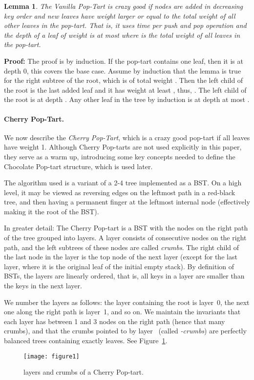 \documentclass[11pt]{article}
\newtheorem{lemma}[theorem]{Lemma}
\newenvironment{proof}{\noindent\textbf{Proof: }\ignorespaces}
  {\hspace*{\fill}\medskip}
\begin{document}
\begin{lemma}
The Vanilla Pop-Tart is crazy good if nodes are added in decreasing key
order and new leaves have weight larger or equal to the total weight of
all other leaves in the pop-tart.  That is, it uses  time per push
and pop operation and the depth of a leaf of weight  is at most
 where  is the total weight of all leaves in the
pop-tart.
\end{lemma}
\begin{proof}
The proof is by induction. If the pop-tart contains one leaf, then it is
at depth 0, this covers the base case.  Assume by induction that the
lemma is true for the right subtree of the root, which is of total
weight . Then the left child of the root is the last added leaf and
it has weight at least , thus, . The left child of the
root is at depth . Any other leaf in the tree by
induction is at depth at most .
\end{proof}

\paragraph{Cherry Pop-Tart.}
We now describe the \emph{Cherry Pop-Tart}, which is a crazy good
pop-tart if all leaves have weight 1. Although Cherry Pop-tarts are not
used explicitly in this paper, they serve as a warm up, introducing some
key concepts needed to define the Chocolate Pop-tart structure, which is
used later.

The algorithm used is a variant of a 2-4 tree implemented as a BST.  On
a high level, it may be viewed as reversing edges on the leftmost path
in a red-black tree, and then having a permanent finger at the leftmost
internal node (effectively making it the root of the BST).

In greater detail: The Cherry Pop-tart is a BST with the nodes on the
right path of the tree grouped into layers. A layer consists of
consecutive nodes on the right path, and the left subtrees of these
nodes are called \emph{crumbs}. The right child of the last node in the
layer is the top node of the next layer (except for the last layer,
where it is the original leaf of the initial empty stack). By definition
of BSTs, the layers are linearly ordered, that is, all keys in a layer
are smaller than the keys in the next layer.

We number the layers as follows: the layer containing the root is
layer~0, the next one along the right path is layer~1, and so on.  We
maintain the invariants that each layer has between 1 and 3 nodes on the
right path (hence that many crumbs), and that the crumbs pointed to by
layer~ (called \emph{-crumbs}) are perfectly balanced trees
containing exactly  leaves. See Figure~\ref{fig:cherry-pop-tart}.
\begin{figure}
\begin{center}
\texttt{[image: figure1]} 
\end{center}
\caption{layers and crumbs of a Cherry Pop-tart.}
\label{fig:cherry-pop-tart}
\end{figure}
\end{document}
